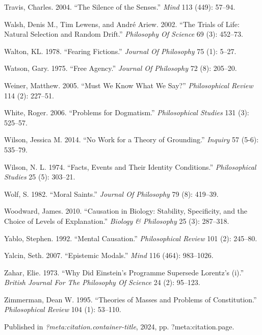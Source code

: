 \documentclass[
  10pt,
  letterpaper,
  DIV=11,
  numbers=noendperiod,
  twoside]{scrartcl}
\newlength{\cslhangindent}
\newenvironment{CSLReferences}[2] %
 {\begin{list}{}{%
  \setlength{\itemindent}{0pt}
  \setlength{\leftmargin}{0pt}
  \setlength{\parsep}{0pt}
  \ifodd #1
   \setlength{\leftmargin}{\cslhangindent}
   \setlength{\itemindent}{-1\cslhangindent}
  \fi
  \setlength{\itemsep}{#2\baselineskip}}}
 {\end{list}}
\begin{document}
\begin{CSLReferences}{1}{0}
Travis, Charles. 2004. {``The Silence of the Senses.''} \emph{Mind} 113
(449): 57--94.

Walsh, Denis M., Tim Lewens, and André Ariew. 2002. {``The Trials of
Life: Natural Selection and Random Drift.''} \emph{Philosophy Of
Science} 69 (3): 452--73.

Walton, KL. 1978. {``Fearing Fictions.''} \emph{Journal Of Philosophy}
75 (1): 5--27.

Watson, Gary. 1975. {``Free Agency.''} \emph{Journal Of Philosophy} 72
(8): 205--20.

Weiner, Matthew. 2005. {``Must We Know What We Say?''}
\emph{Philosophical Review} 114 (2): 227--51.

White, Roger. 2006. {``Problems for Dogmatism.''} \emph{Philosophical
Studies} 131 (3): 525--57.

Wilson, Jessica M. 2014. {``No Work for a Theory of Grounding.''}
\emph{Inquiry} 57 (5-6): 535--79.

Wilson, N. L. 1974. {``Facts, Events and Their Identity Conditions.''}
\emph{Philosophical Studies} 25 (5): 303--21.

Wolf, S. 1982. {``Moral Saints.''} \emph{Journal Of Philosophy} 79 (8):
419--39.

Woodward, James. 2010. {``Causation in Biology: Stability, Specificity,
and the Choice of Levels of Explanation.''} \emph{Biology \& Philosophy}
25 (3): 287--318.

Yablo, Stephen. 1992. {``Mental Causation.''} \emph{Philosophical
Review} 101 (2): 245--80.

Yalcin, Seth. 2007. {``Epistemic Modals.''} \emph{Mind} 116 (464):
983--1026.

Zahar, Elie. 1973. {``Why Did Einstein's Programme Supersede Lorentz's
(i).''} \emph{British Journal For The Philosophy Of Science} 24 (2):
95--123.

Zimmerman, Dean W. 1995. {``Theories of Masses and Problems of
Constitution.''} \emph{Philosophical Review} 104 (1): 53--110.

\end{CSLReferences}



\noindent Published in\emph{
?meta:citation.container-title}, 2024, pp. ?meta:citation.page.
\end{document}
